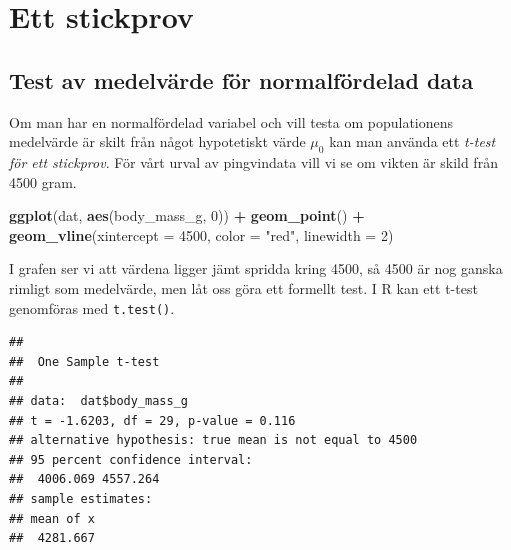 \documentclass[
]{book}
\newenvironment{Shaded}{\begin{snugshade}}{\end{snugshade}}
\newcommand{\AttributeTok}[1]{\textcolor[rgb]{0.13,0.29,0.53}{#1}}
\newcommand{\CommentTok}[1]{\textcolor[rgb]{0.56,0.35,0.01}{\textit{#1}}}
\newcommand{\DecValTok}[1]{\textcolor[rgb]{0.00,0.00,0.81}{#1}}
\newcommand{\FunctionTok}[1]{\textcolor[rgb]{0.13,0.29,0.53}{\textbf{#1}}}
\newcommand{\NormalTok}[1]{#1}
\newcommand{\SpecialCharTok}[1]{\textcolor[rgb]{0.81,0.36,0.00}{\textbf{#1}}}
\newcommand{\StringTok}[1]{\textcolor[rgb]{0.31,0.60,0.02}{#1}}
\theoremstyle{definition}
\theoremstyle{definition}
\theoremstyle{definition}
\theoremstyle{definition}
\theoremstyle{remark}
\begin{document}
\section{Ett stickprov}\label{ett-stickprov}

\subsection{Test av medelvärde för normalfördelad data}\label{test-av-medelvuxe4rde-fuxf6r-normalfuxf6rdelad-data}

Om man har en normalfördelad variabel och vill testa om populationens medelvärde är skilt från något hypotetiskt värde \(\mu_0\) kan man använda ett \emph{t-test för ett stickprov}. För vårt urval av pingvindata vill vi se om vikten är skild från 4500 gram.

\begin{Shaded}
\begin{Highlighting}[]
\FunctionTok{ggplot}\NormalTok{(dat, }\FunctionTok{aes}\NormalTok{(body\_mass\_g, }\DecValTok{0}\NormalTok{)) }\SpecialCharTok{+} 
  \FunctionTok{geom\_point}\NormalTok{() }\SpecialCharTok{+}
  \FunctionTok{geom\_vline}\NormalTok{(}\AttributeTok{xintercept =} \DecValTok{4500}\NormalTok{, }\AttributeTok{color =} \StringTok{"red"}\NormalTok{, }\AttributeTok{linewidth =} \DecValTok{2}\NormalTok{)}
\end{Highlighting}
\end{Shaded}

I grafen ser vi att värdena ligger jämt spridda kring 4500, så 4500 är nog ganska rimligt som medelvärde, men låt oss göra ett formellt test.
I R kan ett t-test genomföras med \texttt{t.test()}.

\begin{Shaded}
\end{Shaded}

\begin{verbatim}
## 
##  One Sample t-test
## 
## data:  dat$body_mass_g
## t = -1.6203, df = 29, p-value = 0.116
## alternative hypothesis: true mean is not equal to 4500
## 95 percent confidence interval:
##  4006.069 4557.264
## sample estimates:
## mean of x 
##  4281.667
\end{verbatim}
\end{document}
